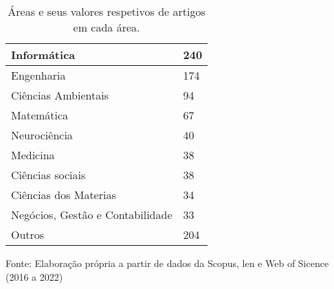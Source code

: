 \begin{table}[H]
	\centering
	\caption{Áreas e seus valores respetivos de artigos em cada área.}\label{tb3}
	\begin{tabular}{@{}ll@{}}
		\toprule
		Informática                      & 240 \\ \midrule
		Engenharia                       & 174 \\
		Ciências Ambientais              & 94  \\
		Matemática                       & 67  \\
		Neurociência                     & 40  \\
		Medicina                         & 38  \\
		Ciências sociais                 & 38  \\
		Ciências dos Materias            & 34  \\
		Negócios, Gestão e Contabilidade & 33  \\
		Outros                           & 204 \\ \bottomrule
	\end{tabular}

	\vspace{0.2cm}
	Fonte: Elaboração própria a partir de dados da Scopus, len e Web of Sicence (2016 a 2022)
\end{table}